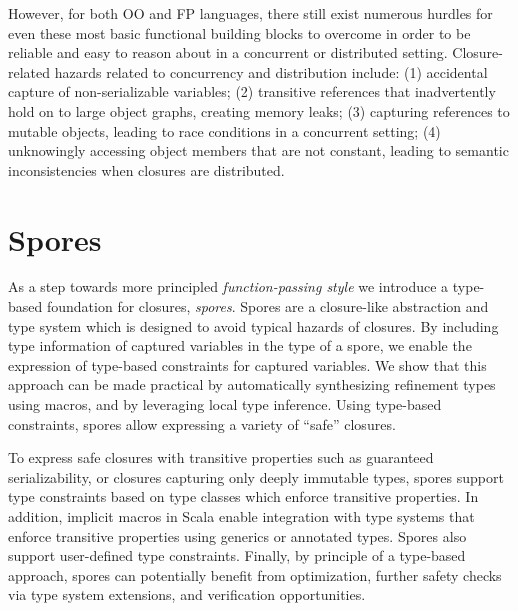 \documentclass[english]{lni}
\begin{document}
However, for both OO and FP languages, there still exist
numerous hurdles for even these most basic functional
building blocks to overcome in order to be reliable and easy to
reason about in a concurrent or distributed setting. Closure-related
hazards related to concurrency and distribution include:
(1) accidental capture of non-serializable variables;
(2) transitive references that inadvertently hold
on to large object graphs, creating memory leaks; (3) capturing
references to mutable objects, leading to race conditions in a concurrent
setting; (4) unknowingly accessing object members that are not constant,
leading to semantic inconsistencies when closures are distributed.


\vspace{-7mm}
\section{Spores}
\vspace{-5mm}
As a step towards more principled {\em function-passing style} we
introduce a type-based foundation for closures, {\em spores}.
Spores are a closure-like abstraction and type system which is designed to
avoid typical hazards of closures. By including type information of captured
variables in the type of a spore, we enable the expression of type-based
constraints for captured variables. We show that this approach can be made
practical by automatically synthesizing refinement types using macros, and
by leveraging local type inference. Using type-based constraints, spores
allow expressing a variety of ``safe'' closures.

To express safe closures with transitive properties such as guaranteed
serializability, or closures capturing only deeply immutable types, spores
support type constraints based on type classes which enforce transitive
properties. In addition, implicit macros in Scala enable integration with type
systems that enforce transitive properties using generics or annotated types.
Spores also support user-defined type constraints. Finally, by principle of a
type-based approach, spores can potentially benefit from optimization, further
safety checks via type system extensions, and verification opportunities.

\end{document}
